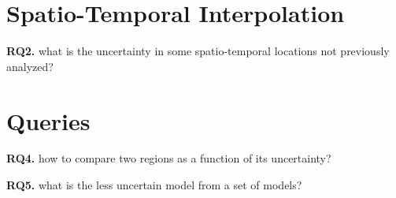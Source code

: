 % 
%
%


\section{Spatio-Temporal Interpolation}

\begin{tcolorbox}
\textbf{RQ2.} what is the uncertainty in some spatio-temporal locations not previously analyzed?
\end{tcolorbox}

\section{Queries}

\begin{tcolorbox}
\textbf{RQ4.} how to compare two regions as a function of its uncertainty?
\end{tcolorbox}

\begin{tcolorbox}
\textbf{RQ5.} what is the less uncertain model from a set of models?
\end{tcolorbox}


